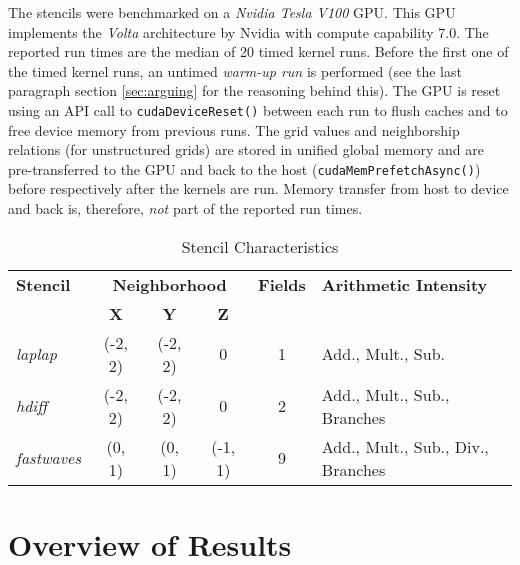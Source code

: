 The stencils were benchmarked on a \emph{Nvidia Tesla V100} GPU. This GPU implements the \emph{Volta} architecture by Nvidia with compute capability $7.0$. The reported run times are the median of 20 timed kernel runs. Before the first one of the timed kernel runs, an untimed \emph{warm-up run} is performed (see the last paragraph section \ref{sec:arguing} for the reasoning behind this). The GPU is reset using an API call to \texttt{cudaDeviceReset()} between each run to flush caches and to free device memory from previous runs. The grid values and neighborship relations (for unstructured grids) are stored in unified global memory and are pre-transferred to the GPU and back to the host (\texttt{cudaMemPrefetchAsync()}) before respectively after the kernels are run. Memory transfer from host to device and back is, therefore, \emph{not} part of the reported run times.

\begin{table}
	\begin{center}                                     
		\begin{tabular}{l c c c c p{4cm}}
		    \hline
		    \textbf{Stencil}  &  \multicolumn{3}{c}{\textbf{Neighborhood}}  &  \textbf{Fields}  &  \textbf{Arithmetic Intensity} \\
		    \cline{2-4}
		    &  \textbf{X}  &  \textbf{Y}  &  \textbf{Z}  & \\
		    \hline
			\hline
		    \emph{laplap}  &  (-2, 2)  &  (-2, 2)  &  0  &  1  &  Add., Mult., Sub. \\
		    \emph{hdiff}  &  (-2, 2)  &  (-2, 2)  &  0  &  2  &  Add., Mult., Sub., Branches \\
		    \emph{fastwaves}  &  (0, 1)  &  (0, 1)  &  (-1, 1)  &  9  & Add., Mult., Sub., Div., Branches \\
		    \hline
		\end{tabular}
	\end{center}
	\caption{\label{tab:benchmarked-stencils}Stencil Characteristics}
\end{table}

\section{Overview of Results}

